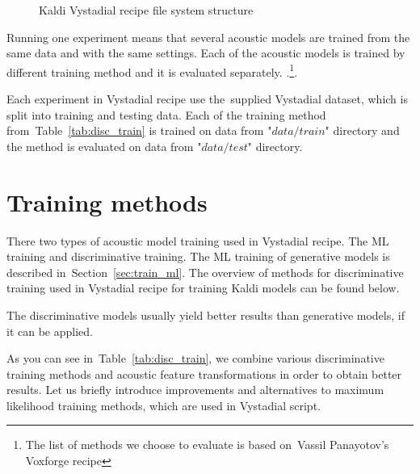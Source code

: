 {\begin{figure}[!htp]
\centering \theverbbox \caption{\small{Kaldi Vystadial recipe file system structure}}
\label{fig:s5_dir}
\end{figure}

Running one experiment means that several acoustic models are trained from the same data and with the same settings. 
Each of the acoustic models is trained by different training method and it is evaluated separately.
.\footnote{The list of methods we choose to evaluate is based on~Vassil Panayotov's Voxforge recipe}.

Each experiment in Vystadial recipe use the~supplied Vystadial dataset, which is split into training and testing data.
Each of the training method from~Table~\ref{tab:disc_train} is trained on data from "$data/train$" directory
and the method is evaluated on data from "$data/test$" directory.

\section{Training methods} 
\label{sec:methods}
There two types of acoustic model training used in Vystadial recipe. The \acl{ML} training and discriminative training.
The \ac{ML} training of generative models is described in~Section~\ref{sec:train_ml}.
The overview of methods for discriminative training used in Vystadial recipe for training Kaldi models
can be found below.

The discriminative models usually yield better results than generative models, if it can be applied. 


As you can see in~Table~\ref{tab:disc_train}, we combine various discriminative training methods
and acoustic feature transformations in order to obtain better results. 
Let us briefly introduce improvements and alternatives to maximum likelihood training methods,
which are used in Vystadial script.

}
